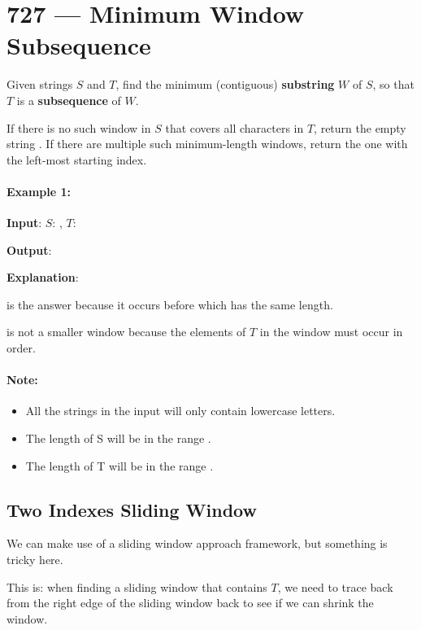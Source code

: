 \section{727 --- Minimum Window Subsequence}
Given strings $ S $ and $ T $, find the minimum (contiguous) \textbf{substring} $ W $ of $ S $, so that $ T $ is a \textbf{subsequence} of $ W $.

If there is no such window in $ S $ that covers all characters in $ T $, return the empty string . If there are multiple such minimum-length windows, return the one with the left-most starting index.

\paragraph{Example 1:}

\begin{flushleft}
\textbf{Input}: $S$: , $T$: 

\textbf{Output}: 

\textbf{Explanation}:
 
 is the answer because it occurs before  which has the same length.

 is not a smaller window because the elements of $ T $ in the window must occur in order.
\end{flushleft}
 

\paragraph{Note:}

\begin{itemize}
\item All the strings in the input will only contain lowercase letters.
\item The length of S will be in the range \fcj{[1, 20000]}.
\item The length of T will be in the range \fcj{[1, 100]}.

\end{itemize}
\subsection{Two Indexes Sliding Window}
We can make use of a sliding window approach framework, but something is tricky here.

This is: when finding a sliding window that contains $T$, we need to trace back from the right edge of the sliding window back to see if we can shrink the window.

